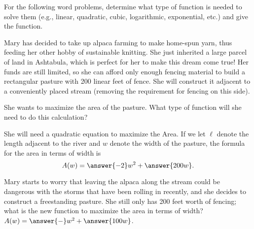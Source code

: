 \documentclass{ximera}
\author{Elizabeth Campolongo}
\begin{document}
\begin{exercise}
For the following word problems, determine what type of function is needed to solve them (e.g., linear, quadratic, cubic, logarithmic, exponential, etc.) and give the function. 


Mary has decided to take up alpaca farming to make home-spun yarn, thus feeding her other hobby of sustainable knitting. She just inherited a large parcel of land in Ashtabula, which is perfect for her to make this dream come true! Her funds are still limited, so she can afford only enough fencing material to build a rectangular pasture with 200 linear feet of fence. She will construct it adjacent to a conveniently placed stream (removing the requirement for fencing on this side). 

She wants to maximize the area of the pasture. What type of function will she need to do this calculation?\\
\begin{exercise}
She will need a quadratic equation to maximize the Area. If we let $\ell$ denote the length adjacent to the river and $w$ denote the width of the pasture, the formula for the area in terms of width is
$$A(w) = \answer{-2}w^2 + \answer{200w}.$$

\begin{exercise} %
Mary starts to worry that leaving the alpaca along the stream could be dangerous with the storms that have been rolling in recently, and she decides to construct a freestanding pasture. She still only has 200 feet worth of fencing; what is the new function to maximize the area in terms of width?\\
$A(w) = \answer{-}w^2 + \answer{100w}$.
\end{exercise}
\end{exercise}


\end{exercise}
\end{document}
